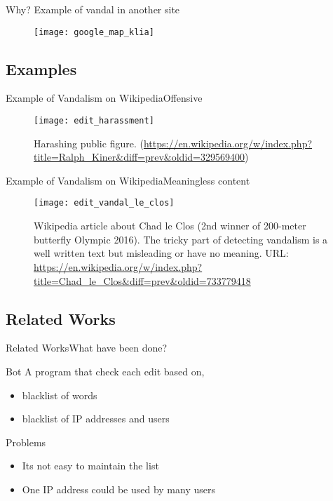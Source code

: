 \documentclass[english]{beamer}
\begin{document}
\begin{frame}
	{Why?}
	{Example of vandal in another site}
	\begin{figure}
		\centering
		\texttt{[image: google\_map\_klia]}
		\caption{}
	\end{figure}
\end{frame}

\subsection{Examples}
\begin{frame}{Example of Vandalism on Wikipedia}{Offensive}
	\begin{figure}
		\centering
		\texttt{[image: edit\_harassment]}
		\caption{
			Harashing public figure.
			(\url{https://en.wikipedia.org/w/index.php?title=Ralph_Kiner&diff=prev&oldid=329569400})
		}
	\end{figure}
\end{frame}

\begin{frame}{Example of Vandalism on Wikipedia}{Meaningless content}
	\begin{figure}
		\centering
		\texttt{[image: edit\_vandal\_le\_clos]}
		\caption{
			Wikipedia article about Chad le Clos (2nd winner of 200-meter butterfly Olympic 2016).
			The tricky part of detecting vandalism is a well written text but
			misleading or have no meaning.
			URL:
			\url{https://en.wikipedia.org/w/index.php?title=Chad_le_Clos&diff=prev&oldid=733779418}
		}
	\end{figure}
\end{frame}

\subsection{Related Works}

\begin{frame}{Related Works}{What have been done?}
	\begin{block}{Bot}
		A program that check each edit based on,
		\begin{itemize}
		\item blacklist of words
		\item blacklist of IP addresses and users
		\end{itemize}
	\end{block}
	\pause
	\begin{alertblock}{Problems}
		\begin{itemize}
		\item Its not easy to maintain the list
		\item One IP address could be used by many users
		\end{itemize}
	\end{alertblock}
\end{frame}
\end{document}
